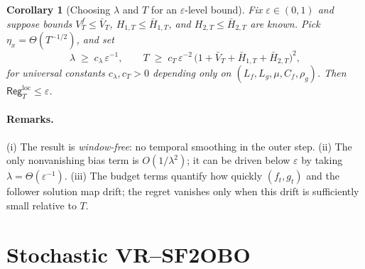 \documentclass{uai2026} %
\newtheorem{remark}{Remark}[section]
\newtheorem{corollary}{Corollary}[section]
\begin{document}
\begin{corollary}[Choosing $\lambda$ and $T$ for an $\varepsilon$-level bound]
\label{cor:eps-windowfree}
Fix $\varepsilon\in(0,1)$ and suppose bounds $V_T^f\le \bar V_T$, $H_{1,T}\le \bar H_{1,T}$, and $H_{2,T}\le \bar H_{2,T}$ are known.
Pick $\eta_x=\Theta(T^{-1/2})$, and set
\[
\lambda \;\ge\; c_\lambda\,\varepsilon^{-1},
\qquad
T \;\ge\; c_T\,\varepsilon^{-2}\,\bigl(1+\bar V_T+\bar H_{1,T}+\bar H_{2,T}\bigr)^2,
\]
for universal constants $c_\lambda,c_T>0$ depending only on $(L_f,L_g,\mu,C_f,\rho_g)$.
Then $\mathsf{Reg}^{\mathrm{loc}}_{T}\le \varepsilon$.
\end{corollary}

\paragraph{Remarks.}
(i) The result is \emph{window-free}: no temporal smoothing in the outer step.
(ii) The only nonvanishing bias term is $O(1/\lambda^2)$; it can be driven below $\varepsilon$ by taking $\lambda=\Theta(\varepsilon^{-1})$.
(iii) The budget terms quantify how quickly $(f_t,g_t)$ and the follower solution map drift; the regret vanishes only when this drift is sufficiently small relative to $T$.
    
\section{Stochastic VR–SF2OBO}
\label{sec:stoch}
\end{document}
